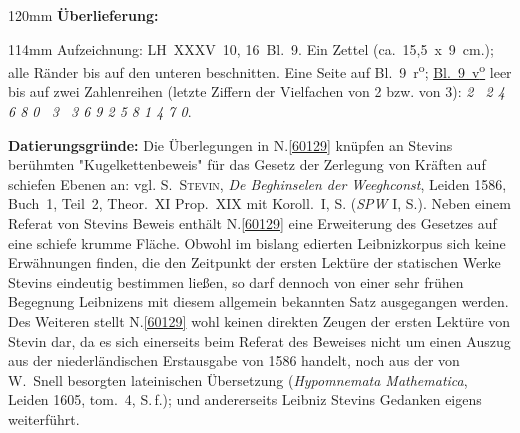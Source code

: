 
\begin{ledgroupsized}[r]{120mm}
\footnotesize
\pstart
\noindent\textbf{Überlieferung:}
\pend
\end{ledgroupsized}
\begin{ledgroupsized}[r]{114mm}
\footnotesize
\pstart
\parindent -6mm
%
Aufzeichnung:
LH~XXXV~10, 16~Bl.~9. 
Ein Zettel (ca.~15,5~x~9~cm.);
alle Ränder bis auf den unteren beschnitten.
Eine Seite auf Bl.~9~r\textsuperscript{o};
\href{\Scan{LH_35_10_16_009v}}%
{Bl.~9~v\textsuperscript{o}}
leer bis auf zwei Zahlenreihen 
(letzte Ziffern der Vielfachen von 2 bzw. von 3): 
\textit{2 \textbar\ 2 4 6 8 0 \textbar\textbar\ 3 \textbar\ 3 6 9 2 5 8 1 4 7 0}.
\pend
\end{ledgroupsized}
\vspace{5mm}
\begin{ledgroup}
\footnotesize
\pstart
\noindent
\textbf{Datierungsgründe:}
Die Überlegungen in N.\;\ref{60129} knüpfen an 
Stevins 
berühmten "Kugelkettenbeweis"
für das Gesetz der Zerlegung von Kräften auf schiefen Ebenen an: 
vgl. 
%
\textsc{S.~Stevin}, \cite{00196}\textit{De Beghinselen der Weeghconst}, Leiden 1586, 
Buch~1, Teil~2,
Theor.~XI Prop.~XIX mit Koroll.~I, S.
(\cite{02084}\textit{SPW} I, S.).
Neben einem Referat von Stevins Beweis enthält N.\;\ref{60129} eine Erweiterung des Gesetzes auf eine schiefe krumme Fläche.
\pend
\pstart
Obwohl im bislang edierten Leibnizkorpus sich keine Erwähnungen finden, die  den Zeitpunkt der ersten Lektüre der statischen Werke Stevins eindeutig bestimmen ließen, so darf dennoch von einer sehr frühen Begegnung Leibnizens mit diesem allgemein bekannten Satz ausgegangen werden. 
Des Weiteren stellt N.\;\ref{60129} wohl keinen direkten Zeugen der ersten Lektüre von Stevin dar, 
da es sich einerseits beim Referat des Beweises nicht um einen Auszug aus der niederländischen \cite{00196}Erstausgabe von 1586 handelt,
noch aus der von 
W.~Snell 
besorgten lateinischen Übersetzung (\cite{02130}\textit{Hypomnemata Mathematica}, Leiden 1605, tom.~4, S.\,f.);
und andererseits Leibniz Stevins Gedanken eigens weiterführt.
\pend
\pstart

\end{ledgroup}
